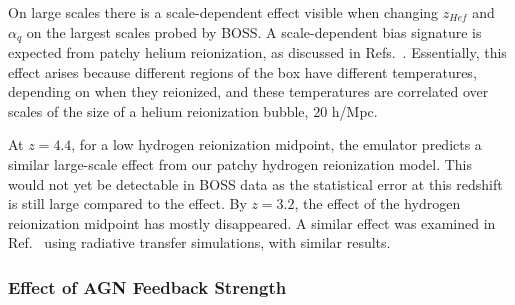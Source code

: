 \documentclass[a4paper,11pt]{article}
\begin{document}
On large scales there is a scale-dependent effect visible when changing $z_{Hef}$ and $\alpha_q$ on the largest scales probed by BOSS. A scale-dependent bias signature is expected from patchy helium reionization, as discussed in Refs.~\cite{Pontzen:2014a, Pontzen:2014b,  Gontcho:2014}. Essentially, this effect arises because different regions of the box have different temperatures, depending on when they reionized, and these temperatures are correlated over scales of the size of a helium reionization bubble, $20$ h/Mpc.

At $z=4.4$, for a low hydrogen reionization midpoint, the emulator predicts a similar large-scale effect from our patchy hydrogen reionization model. This would not yet be detectable in BOSS data as the statistical error at this redshift is still large compared to the effect. By $z=3.2$, the effect of the hydrogen reionization midpoint has mostly disappeared. A similar effect was examined in Ref.~\cite{Molaro:2022} using radiative transfer simulations, with similar results.

\subsubsection{Effect of AGN Feedback Strength}
\label{sec:agnresult}
\end{document}
